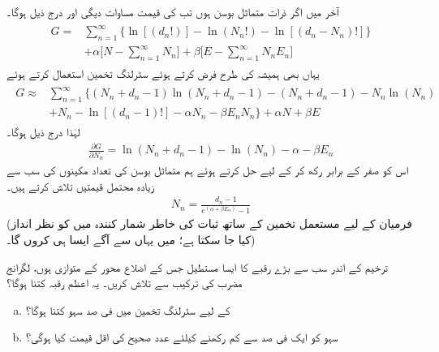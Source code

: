 آخر میں اگر ذرات متماثل بوسن ہوں تب  کی قیمت مساوات  دیگی اور درج ذیل ہوگا۔
\begin{gather}
\begin{aligned}
G =& \sum_{n = 1}^{\infty} \{ \ln[(d_n !) ] - \ln(N_n !) - \ln[(d_n - N_n) ! ] \} \\
&+ \alpha \big [ N - \sum_{n = 1}^{\infty} N_n \big ] + \beta \big [ E - \sum_{n = 1}^{\infty} N_n E_n \big ]
\end{aligned}
\end{gather}
یہاں بھی ہمیشہ کی طرح  فرض کرتے ہوئے سٹرلنگ تخمین استعمال کرتے ہوئے 
\begin{gather}
\begin{aligned}
G \approx &\sum_{n = 1}^{\infty} \{ (N_n + d_n - 1) \ln(N_n + d_n - 1) - (N_n + d_n - 1) - N_n \ln(N_n) \\
&+ N_n - \ln[(d_n - 1) !] - \alpha N_n - \beta E_n N_n \} + \alpha N + \beta E
\end{aligned}
\end{gather}
لہٰذا درج ذیل ہوگا۔
\begin{align}
\frac{\partial G}{\partial N_n} = \ln(N_n + d_n - 1) - \ln(N_n) - \alpha - \beta E_n
\end{align}
اس کو صفر کے برابر رکھ کر  کے لیے حل کرتے ہوئے ہم متماثل بوسن کی تعداد مکینوں کی سب سے زیادہ محتمل قیمتیں تلاش کرتے ہیں۔ 
\begin{align}\label{مساوات_متماثل_سب_سے_زیادہ_محتمل_برائے_بوسن}
N_n = \frac{d_n - 1}{e^{(\alpha + \beta E_n)} - 1}
\end{align}
(فرمیان کے لیے مستعمل تخمین کے ساتھ ثبات کی خاطر شمار کنندہ میں  کو نظر انداز کیا جا سکتا ہے؛ میں یہاں سے آگے ایسا ہی کروں گا۔)

ترخیم  کے اندر سب سے بڑے رقبے کا ایسا مستطیل جس کے اضلاع محور کے متوازی ہوں، لگرانج مضرب کی ترکیب سے تلاش کریں۔ یہ اعظم رقبہ کتنا ہوگا؟ 
\begin{enumerate}[a.]
\item
{} کے لیے سٹرلنگ تخمین میں فی صد سہو کتنا  ہوگا؟
\item
سہو کو ایک فی صد سے کم رکھنے کیلئے عدد صحیح  کی اقل قیمت کیا ہوگی؟ 
\end{enumerate}



